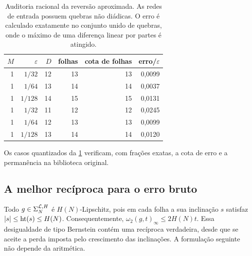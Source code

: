 \begin{table}[t]
 \centering
\caption{Auditoria racional da reversão aproximada. As redes de entrada
 possuem quebras não diádicas. O erro é calculado exatamente no conjunto
 unido de quebras, onde o máximo de uma diferença linear por partes é
 atingido.}\label{artigo_3:tab:approximate-reverse-audit}
\small
 \begin{tabular}{rrrrrr}
\toprule
$M$ & $\varepsilon$ & $D$ & folhas & cota de folhas & erro/$\varepsilon$\\
\midrule
1 & $1/32$ & 12 & 13 & 13 & 0{,}0099\\
1 & $1/64$ & 13 & 14 & 14 & 0{,}0037\\
1 & $1/128$ & 14 & 15 & 15 & 0{,}0131\\
1 & $1/32$ & 11 & 12 & 12 & 0{,}0245\\
1 & $1/64$ & 12 & 13 & 13 & 0{,}0099\\
1 & $1/128$ & 13 & 14 & 14 & 0{,}0120\\
\bottomrule
\end{tabular}
\end{table}

Os casos quantizados da \cref{artigo_3:tab:approximate-reverse-audit} verificam, com
frações exatas, a cota de erro e a permanência na biblioteca original.

\subsection{A melhor recíproca para o erro bruto}

Todo $g\in\Sigma_N^{\mathcal{L},H}$ é $H(N)$-Lipschitz, pois em cada folha a sua
inclinação $s$ satisfaz $|s|\le\operatorname{ht}(s)\le H(N)$. Consequentemente,
$\omega_2(g,t)_\infty\le2H(N)t$. Essa desigualdade de tipo Bernstein contém
uma recíproca verdadeira, desde que se aceite a perda imposta pelo crescimento
das inclinações. A formulação seguinte não depende da aritmética.

